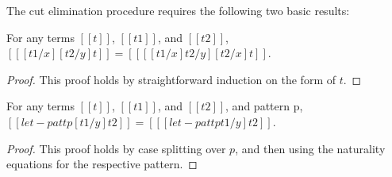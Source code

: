\begin{report}
  The cut elimination procedure requires the following two basic
results:
\begin{lemma}
  \label{lemma:substitution_distribution}
  For any terms $[[t]]$, $[[t1]]$, and $[[t2]]$, $[[ [t1/x][t2/y]t]] = [[ [ [t1/x]t2/y][t2/x]t]]$.
\end{lemma}
\begin{proof}
  This proof holds by straightforward induction on the form of $t$.
\end{proof}

\begin{lemma}
  \label{lemma:let-pat_distribution}
  For any terms $[[t]]$, $[[t1]]$, and $[[t2]]$, and pattern p, \\
  $[[ let-pat t p [t1/y]t2]] = [[ [ let-pat t p t1/y]t2]]$.
\end{lemma}
\begin{proof}
  This proof holds by case splitting over $p$, and then using the
  naturality equations for the respective pattern.
\end{proof}
\end{report}

